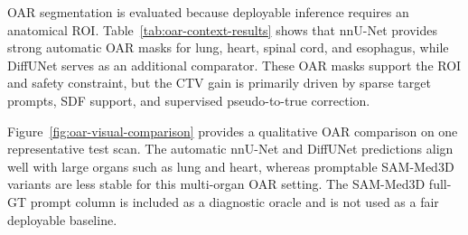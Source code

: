 \documentclass[preprint,12pt]{elsarticle}
\begin{document}


OAR segmentation is evaluated because deployable inference requires an anatomical ROI. Table~\ref{tab:oar-context-results} shows that nnU-Net provides strong automatic OAR masks for lung, heart, spinal cord, and esophagus, while DiffUNet serves as an additional comparator. These OAR masks support the ROI and safety constraint, but the CTV gain is primarily driven by sparse target prompts, SDF support, and supervised pseudo-to-true correction.

Figure~\ref{fig:oar-visual-comparison} provides a qualitative OAR comparison on one representative test scan. The automatic nnU-Net and DiffUNet predictions align well with large organs such as lung and heart, whereas promptable SAM-Med3D variants are less stable for this multi-organ OAR setting. The SAM-Med3D full-GT prompt column is included as a diagnostic oracle and is not used as a fair deployable baseline.
\end{document}

